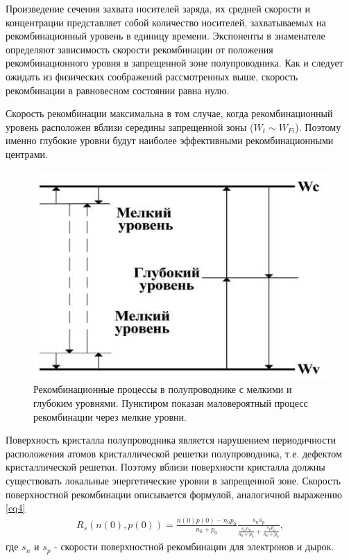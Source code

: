 \documentclass[a4paper,12pt]{article}
\begin{document}
Произведение сечения захвата носителей заряда, их средней скорости и концентрации представляет собой количество носителей, захватываемых на рекомбинационный уровень в единицу времени. Экспоненты в знаменателе определяют зависимость скорости рекомбинации от положения рекомбинационного уровня в запрещенной зоне полупроводника. Как и следует ожидать из физических соображений рассмотренных выше, скорость рекомбинации в равновесном состоянии равна нулю.

Скорость рекомбинации максимальна в том случае, когда рекомбинационный уровень расположен вблизи середины запрещенной зоны ($W_t\sim W_{Fi}$). Поэтому именно глубокие уровни будут наиболее эффективными рекомбинационными центрами.


\begin{figure}[H]
	\centering
	\includegraphics[]{5}
	\caption{Рекомбинационные процессы в полупроводнике с мелкими и глубоким уровнями. Пунктиром показан маловероятный процесс рекомбинации через мелкие уровни.}
	\label{fig:figure4}
\end{figure}

Поверхность кристалла полупроводника является нарушением периодичности расположения атомов кристаллической решетки полупроводника, т.е. дефектом кристаллической решетки. Поэтому вблизи поверхности кристалла должны существовать локальные энергетические уровни в запрещенной зоне. Скорость поверхностной рекомбинации описывается формулой, аналогичной выражению \eqref{eq4}
\begin{gather}
	\label{eq5}
	R_{s}(n(0), p(0))=\frac{n(0) p(0)-n_{0} p_{0}}{n_{0}+p_{0}} \frac{s_{n} s_{p}}{\frac{s_{n} n_{0}}{n_{0}+p_{0}}+\frac{s_{p} p_{0}}{n_{0}+p_{0}}},
\end{gather}
где $s_n$ и $s_p$ - скорости поверхностной рекомбинации для электронов и дырок.
\end{document}
